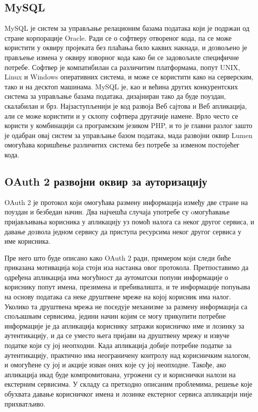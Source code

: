 \documentclass[12pt,oneside]{memoir}
\begin{document}
\subsection{MySQL}
MySQL је систем за управљање релационим базама података који је подржан од стране корпорације Oracle. Ради се о софтверу отвореног кода, па се може користити у оквиру пројеката без плаћања било каквих накнада, и дозвољено је прављење измена у оквиру изворног кода како би се задовољиле специфичне потребе. Софтвер је компатибилан са различитим платформама, попут UNIX, Linux и Windows оперативних система, и може се користити како на серверским, тако и на десктоп машинама. MySQL је, као и већина других конкурентских система за управљање базама података, дизајниран тако да буде поуздан, скалабилан и брз. Најзаступљенији је код развоја Веб сајтова и Веб апликација, али се може користити и у склопу софтвера другачије намене. Врло често се користи у комбинацији са програмским језиком PHP, и то је главни разлог зашто је одабран овај систем за управљање базом података, мада развојни оквир Lumen омогућава коришћење различитих система без потребе за изменом постојећег кода.

\subsection{OAuth 2 развојни оквир за ауторизацију}
OAuth 2 је протокол који омогућава размену информација између две стране на поуздан и безбедан начин. Два најчешћа случаја употребе су oмогућавање пријављивања корисника у апликацију уз помоћ налога са неког другог сервиса, и давање дозвола једном сервису да приступа ресурсима неког другог сервиса у име корисника.

Пре него што буде описано како OAuth 2 ради, примером који следи биће приказана мотивација која стоји иза настанка овог протокола. Претпоставимо да одређена апликација има могућност да аутоматски попуни информације о кориснику попут имена, презимена и пребивалишта, и те информације попуњава на основу података са неке друштвене мреже на којој корисник има налог. Уколико та друштвена мрежа не поседује механизме за размену информација са спољашњим сервисима, једини начин којим се могу прикупити потребне информације је да апликација кориснику затражи корисничко име и лозинку за аутентикацију, и да се уместо њега пријави на друштвену мрежу и извуче податке који су јој неопходни. Када апликација добије потребне податке за аутентикацију, практично има неограничену контролу над корисничким налогом, и омогућене су јој и акције изван оних које су јој неопходне. Такође, ако апликација икад буде компромитована, угрожени су и кориснички налози на екстерним сервисима. У складу са претходно описаним проблемима, решење које обухвата давање корисничког имена и лозинке екстерног сервиса апликацији није прихватљиво.
\end{document}
